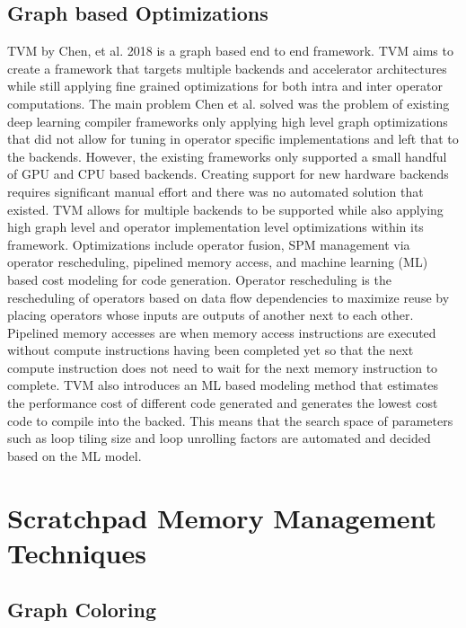 \subsection{Graph based Optimizations}
TVM by Chen, et al. 2018 is a graph based end to end framework. 
TVM aims to create a framework that targets
multiple backends and accelerator architectures while still applying
fine grained optimizations for both intra and inter operator computations.
The main problem Chen et al. solved was the problem of existing deep learning
compiler frameworks only applying high level graph optimizations that did
not allow for tuning in operator specific implementations and left that to
the backends. However, the existing frameworks only supported a small handful
of GPU and CPU based backends. Creating support for new hardware backends
requires significant manual effort and there was no automated solution that 
existed. TVM allows for multiple backends to be supported while also
applying high graph level and operator implementation level optimizations
within its framework. Optimizations include operator fusion, SPM management via
operator rescheduling, pipelined memory access, and machine learning (ML) based
cost modeling for code generation. 
Operator rescheduling is the rescheduling of operators based
on data flow dependencies to maximize reuse by placing operators whose
inputs are outputs of another next to each other. Pipelined memory accesses are
when memory access instructions are executed without compute instructions having
been completed yet so that the next compute instruction does not need to wait
for the next memory instruction to complete. TVM also introduces an ML
based modeling method that estimates the performance cost of different
code generated and generates the lowest cost code to compile into the backed.
This means that the search space of parameters such as loop tiling size and 
loop unrolling factors are automated and decided based on the ML model.



\section{Scratchpad Memory Management Techniques}

\subsection{Graph Coloring}

